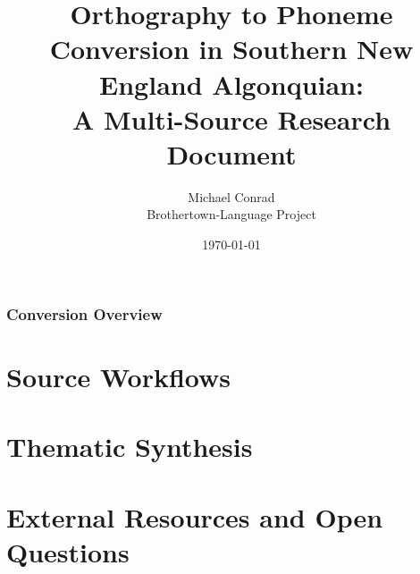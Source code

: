 \documentclass[11pt,a4paper]{article}
\title{Orthography to Phoneme Conversion in Southern New England Algonquian:\\A Multi-Source Research Document}
\author{Michael Conrad\\Brothertown-Language Project}
\date{\today}
\begin{document}
\maketitle
\tableofcontents
\newpage

\section{Conversion Overview}
\label{sec:overview}



\part{Source Workflows}










\part{Thematic Synthesis}







\part{External Resources and Open Questions}





\end{document}
